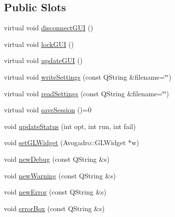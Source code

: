 \subsection*{Public Slots}
\begin{DoxyCompactItemize}
\item 
virtual void \hyperlink{classGlobalSearch_1_1AbstractDialog_af25e016b17402f6695eb9428c197bce6}{disconnect\-G\-U\-I} ()
\item 
virtual void \hyperlink{classGlobalSearch_1_1AbstractDialog_af0a84714b098c38a3311299fc7f547bc}{lock\-G\-U\-I} ()
\item 
virtual void \hyperlink{classGlobalSearch_1_1AbstractDialog_a70a82283ccccb007cf0142f2e166240f}{update\-G\-U\-I} ()
\item 
virtual void \hyperlink{classGlobalSearch_1_1AbstractDialog_afab2e36367be4fa97e891b020afd1e60}{write\-Settings} (const Q\-String \&filename=\char`\"{}\char`\"{})
\item 
virtual void \hyperlink{classGlobalSearch_1_1AbstractDialog_aa798b5d3d1099bce37207a3f15b0eb6a}{read\-Settings} (const Q\-String \&filename=\char`\"{}\char`\"{})
\item 
virtual void \hyperlink{classGlobalSearch_1_1AbstractDialog_a6e9ef21da0b2e60513a11f7de55ffbd7}{save\-Session} ()=0
\item 
void \hyperlink{classGlobalSearch_1_1AbstractDialog_a40bbc9eb104fe418e1fb2ba93bd2a2ae}{update\-Status} (int opt, int run, int fail)
\item 
void \hyperlink{classGlobalSearch_1_1AbstractDialog_a861a8ddbb5ca235f5966737755911aa3}{set\-G\-L\-Widget} (Avogadro\-::\-G\-L\-Widget $\ast$w)
\item 
void \hyperlink{classGlobalSearch_1_1AbstractDialog_a7353bd5b3393faf017287674691e56c6}{new\-Debug} (const Q\-String \&s)
\item 
void \hyperlink{classGlobalSearch_1_1AbstractDialog_abe3084783126e2d1f09c9250c11f8f39}{new\-Warning} (const Q\-String \&s)
\item 
void \hyperlink{classGlobalSearch_1_1AbstractDialog_ae0b664aa133ded37df0dc5f7a040f0c5}{new\-Error} (const Q\-String \&s)
\item 
void \hyperlink{classGlobalSearch_1_1AbstractDialog_aee94863a2a275b8a91613b191451bc1e}{error\-Box} (const Q\-String \&s)
\end{DoxyCompactItemize}
